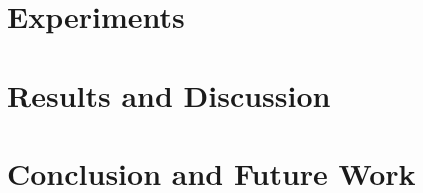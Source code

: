 \documentclass[numbers=noenddot,doktyp=marbeit,fontsize=12pt,sprache=english,hausschrift=true,draft=false]{TUBAFarbeiten}
\begin{document}




\newpage

\section{Experiments}\label{sec:experiments}





\newpage

\section{Results and Discussion}\label{sec:results}






\newpage

\section{Conclusion and Future Work}\label{sec:conclusion}



\newpage
\end{document}
